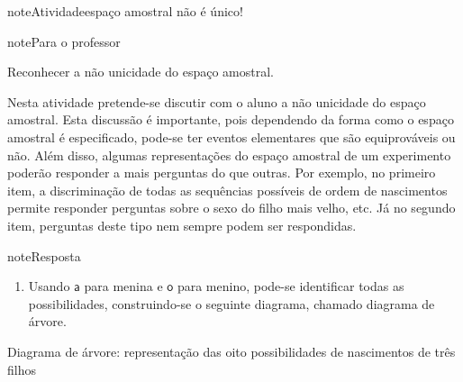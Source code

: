 \label{\detokenize{PE511-2:praticando-probabilidade-conceitos-basicos}}\label{\detokenize{PE511-2::doc}}\begin{sphinxadmonition}{note}{Atividade}{espaço amostral não é único!}
\label{ativ-espaco-amostral-nao-e}

\begin{sphinxadmonition}{note}{Para o professor}

  Reconhecer a não unicidade do espaço amostral.

 Nesta atividade pretende-se discutir com o aluno a não unicidade do espaço amostral. Esta discussão é importante, pois dependendo da forma como o espaço amostral é especificado, pode-se ter eventos elementares que são equiprováveis ou não. Além disso, algumas representações do espaço amostral de um experimento poderão responder a mais perguntas do que outras. Por exemplo, no primeiro item, a discriminação de todas as sequências possíveis de ordem de nascimentos permite  responder perguntas sobre o sexo do filho mais velho, etc. Já no segundo item, perguntas deste tipo nem sempre podem ser respondidas.

\begin{sphinxadmonition}{note}{Resposta}

\begin{enumerate}
\item {} 
Usando \(\textsf{a}\) para menina e \(\textsf{o}\) para menino, pode-se identificar todas as possibilidades, construindo-se o seguinte diagrama, chamado diagrama de árvore.

\end{enumerate}
\begin{center}\end{center}
Diagrama de árvore: representação das oito possibilidades de nascimentos de três filhos


\end{sphinxadmonition}
\end{sphinxadmonition}
\end{sphinxadmonition}
